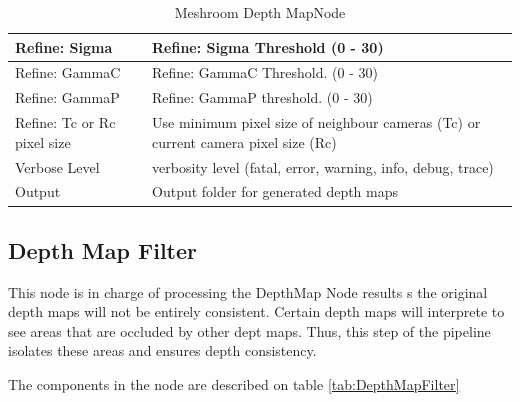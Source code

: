 \documentclass[12pt]{report}
\begin{document}
\begin{table}[h!]
{\begin{tabular}{|l|l|}
  Refine: Sigma                       & Refine: Sigma Threshold (0 - 30)                                        \\ \hline
  Refine: GammaC                      & Refine: GammaC Threshold. (0 - 30)                                      \\ \hline
  Refine: GammaP                      & Refine: GammaP threshold. (0 - 30)                                      \\ \hline
  Refine: Tc or Rc pixel size    & Use minimum pixel size of neighbour cameras (Tc) or current camera pixel size (Rc)                                \\ \hline
  Verbose Level                       & verbosity level (fatal, error, warning, info, debug, trace)             \\ \hline
  Output                              & Output folder for generated depth maps                                  \\ \hline
  \end{tabular}%
  }
  \caption{Meshroom Depth MapNode}
  \label{tab:DepthMap}
  \end{table}


\subsection{Depth Map Filter}
This node is in charge of processing the DepthMap Node results s the original depth maps will not be entirely consistent.
Certain depth maps will interprete to see areas that are occluded by other dept maps. Thus, this step of the pipeline isolates these areas and ensures depth consistency.

The components in the node are described on table \ref{tab:DepthMapFilter}
\end{document}
